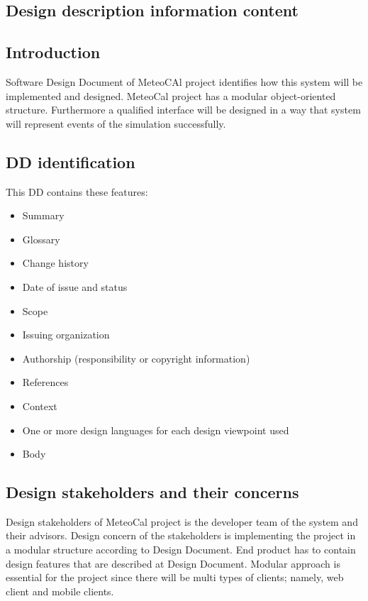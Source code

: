 \newpage

\begin{center}
\section{Design description information content}
\end{center}

\subsection{Introduction}
\qquad Software Design Document of MeteoCAl project identifies how this system will be implemented and designed. MeteoCal project has a modular object-oriented structure. Furthermore a qualified interface will be designed in a way that system will represent events of the simulation successfully.
\subsection{DD identification}
\qquad This DD contains these features:
\begin{itemize}
  \item Summary
  \item Glossary
  \item Change history
  \item Date of issue and status
  \item Scope
  \item Issuing organization
  \item Authorship (responsibility or copyright information)
  \item References
  \item Context
  \item One or more design languages for each design viewpoint used
  \item Body
\end{itemize}
\subsection{Design stakeholders and their concerns}
\qquad Design stakeholders of MeteoCal project is the developer team of the system and their advisors. Design concern of the stakeholders is implementing the project in a modular structure according to Design Document. End product has to contain design features that are described at Design Document. Modular approach is essential for the project since there will be multi types of clients; namely, web client and mobile clients.
